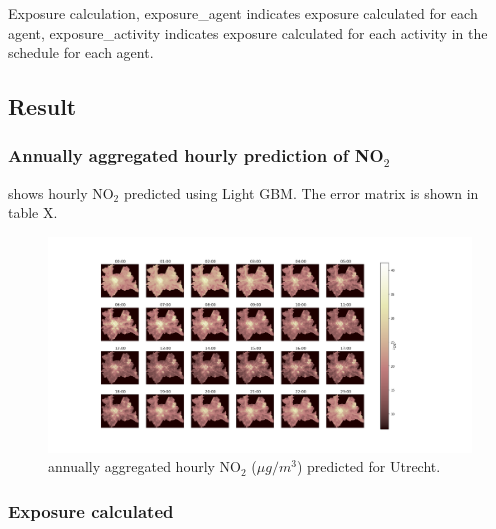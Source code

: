\documentclass[]{article}
\begin{document}
\begin{algorithm}[H]
 
 \caption{Exposure calculation, exposure\_agent indicates exposure calculated for each agent, exposure\_activity indicates exposure calculated for each activity in the schedule for each agent.}
 \label{pc_e}
\end{algorithm}


\subsection{Result}
\label{sec:result}

\subsubsection{Annually aggregated hourly prediction of NO$_2$}

 shows hourly NO$_2$ predicted using Light GBM. The error matrix is shown in table X.  

\begin{figure}[h]
    \centering
        \includegraphics[scale = 0.3]{figure/prediUt.png}
    \caption{annually aggregated hourly NO$_2$ ($\mu g / m^3$) predicted for Utrecht.}
    \label{con}
\end{figure}

\subsubsection{Exposure calculated}
\end{document}
